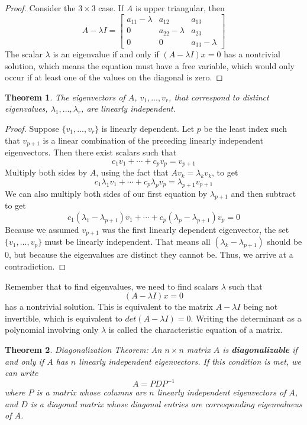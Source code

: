 \documentclass[letterpaper]{article}
\newtheorem{theorem}{Theorem}
\theoremstyle{definition}
\begin{document}
\begin{proof}
Consider the $3 \times 3$ case. If $A$ is upper triangular, then 
$$ A - \lambda I = \begin{bmatrix}
a_{11} - \lambda & a_{12} & a_{13} \\
0 & a_{22} - \lambda & a_{23} \\
0 & 0 & a_{33} - \lambda
\end{bmatrix}$$
The scalar $\lambda$ is an eigenvalue if and only if $(A - \lambda I)x = 0$ has a nontrivial solution, which means the equation must have a free variable, which would only occur if at least one of the values on the diagonal is zero. 
\end{proof}

\begin{theorem}
The eigenvectors of $A$, $v_1 , ... , v_r$, that correspond to \textit{distinct} eigenvalues, $\lambda_1 , ..., \lambda_r$, are linearly independent. 
\end{theorem}

\begin{proof}
Suppose $\{v_1, ..., v_r\}$ is linearly dependent. Let $p$ be the least index such that $v_{p+1}$ is a linear combination of the preceding linearly independent eigenvectors. Then there exist scalars such that 
$$c_1 v_1 + \cdots + c_p v_p = v_{p+1}$$
Multiply both sides by $A$, using the fact that $Av_k = \lambda_k v_k$, to get
$$c_1 \lambda_1 v_1 + \cdots + c_p \lambda_p v_p = \lambda_{p+1} v_{p+1}$$
We can also multiply both sides of our first equation by $\lambda_{p+1}$ and then subtract to get 
$$c_1 (\lambda_1 - \lambda_{p+1})v_1 + \cdots + c_p (\lambda_p - \lambda_{p+1})v_p = 0$$
Because we assumed $v_{p+1}$ was the first linearly dependent eigenvector, the set $\{v_1 , ..., v_p\}$ must be linearly independent. That means all $(\lambda_k - \lambda_{p+1})$ should be 0, but because the eigenvalues are distinct they cannot be. Thus, we arrive at a contradiction. 
\end{proof}

Remember that to find eigenvalues, we need to find scalars $\lambda$ such that 
$$(A - \lambda I)x = 0$$
has a nontrivial solution. This is equivalent to the matrix $A - \lambda I$ being not invertible, which is equivalent to $det(A - \lambda I) = 0$. Writing the determinant as a polynomial involving only $\lambda$ is called the characteristic equation of a matrix. 

\begin{theorem}{Diagonalization Theorem: }
An $n \times n$ matrix $A$ is \textbf{diagonalizable} if and only if $A$ has $n$ linearly independent eigenvectors. If this condition is met, we can write 
$$A = PDP^{-1}$$
where $P$ is a matrix whose columns are $n$ linearly independent eigenvectors of $A$, and $D$ is a diagonal matrix whose diagonal entries are corresponding eigenvalueus of $A$. 
\end{theorem}
\end{document}
